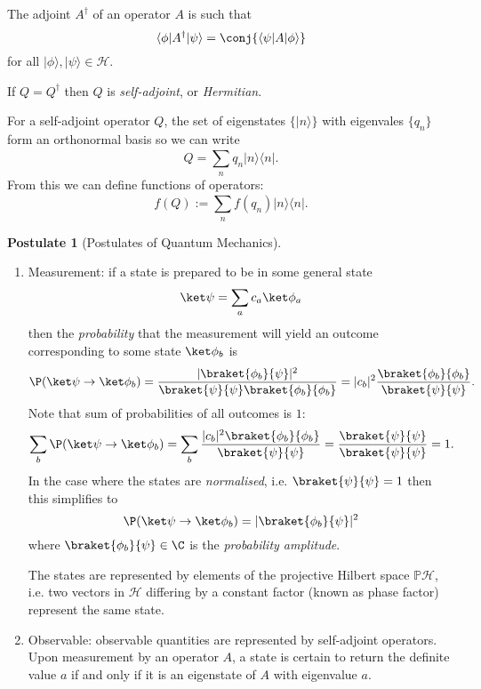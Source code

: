 \documentclass[a4paper]{article}
\renewcommand*{\H}{\mathcal{H}}
\newcommand*{\bk}{\braket}
\theoremstyle{definition}
\newtheorem*{postulate}{Postulate}
\begin{document}
\begin{definition}[Adjoint]
  The adjoint \(A^\dag\) of an operator \(A\) is such that
  \[
    \langle\phi|A^\dag|\psi\rangle = \conj{\langle\psi|A|\phi\rangle} 
  \] 
  for all \(|\phi\rangle, |\psi\rangle \in \H\).
\end{definition}

\begin{definition}
  If \(Q = Q^\dag\) then \(Q\) is \emph{self-adjoint}, or \emph{Hermitian}.
\end{definition}

For a self-adjoint operator \(Q\), the set of eigenstates \(\{|n\rangle\}\) with eigenvales \(\{q_n\}\) form an orthonormal basis so we can write
\[
  Q = \sum_{n}^{ }q_n |n\rangle \langle n|.
\]
From this we can define functions of operators:
\[
  f(Q) := \sum_{n}^{ }f(q_n) |n\rangle \langle n|.
\]

\begin{postulate}[Postulates of Quantum Mechanics]\leavevmode
  \begin{enumerate}
  \item Measurement: if a state is prepared to be in some general state\
    \[
      \ket \psi = \sum_ac_a\ket \phi_a
    \]
    then the \emph{probability} that the measurement will yield an outcome corresponding to some state \(\ket \phi_b\) is
    \[
      \P(\ket \psi\to \ket\phi_b) = \frac{|\bk{\phi_b}{\psi}|^2}{\bk{\psi}{\psi}\bk{\phi_b}{\phi_b}} = |c_b|^2 \frac{\bk{\phi_b}{\phi_b}}{\bk{\psi}{\psi}}.
    \]
    Note that sum of probabilities of all outcomes is \(1\):
    \[
      \sum_b\P(\ket\psi \to \ket\phi_b) = \sum_b\frac{|c_b|^2\bk{\phi_b}{\phi_b}}{\bk{\psi}{\psi}} = \frac{\bk{\psi}{\psi}}{\bk{\psi}{\psi}} = 1.
    \]
    In the case where the states are \emph{normalised}, i.e. \(\bk{\psi}{\psi} = 1\) then this simplifies to
    \[
      \P(\ket\psi \to \ket\phi_b) = |\bk{\phi_b}{\psi}|^2
    \]
    where \(\bk{\phi_b}{\psi} \in\C\) is the \emph{probability amplitude}.

    The states are represented by elements of the projective Hilbert space \(\mathbb{P}\H\), i.e. two vectors in \(\H\) differing by a constant factor (known as phase factor) represent the same state.
  \item Observable: observable quantities are represented by self-adjoint operators. Upon measurement by an operator \(A\), a state is certain to return the definite value \(a\) if and only if it is an eigenstate of \(A\) with eigenvalue \(a\).
  \end{enumerate}
\end{postulate}
\end{document}
